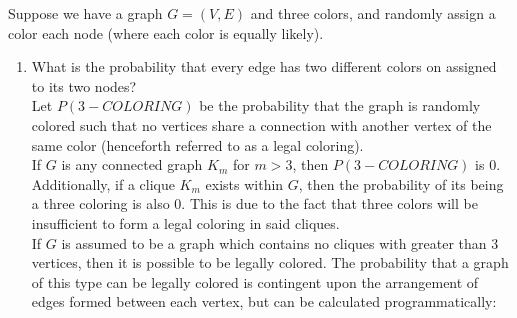 \documentclass{article}
\begin{document}
\nextprob
Suppose we have a graph $G=(V,E)$ and three colors, and randomly assign a color
each node (where each color is equally likely).
\begin{enumerate}
    \item What is the probability that every edge has two different colors on
        assigned to its two nodes? \\
        
        Let $P(3-COLORING)$ be the probability that the graph is randomly colored such that no vertices share a connection with another vertex of the same color (henceforth referred to as a legal coloring). \\
        
        If $G$ is any connected graph $K_m$ for $m > 3$, then $P(3-COLORING)$ is 0. Additionally, if a clique $K_m$ exists within $G$, then the probability of its being a three coloring is also 0. This is due to the fact that three colors will be insufficient to form a legal coloring in said cliques. \\
        
        If $G$ is assumed to be a graph which contains no cliques with greater than 3 vertices, then it is possible to be legally colored. The probability that a graph of this type can be legally colored is contingent upon the arrangement of edges formed between each vertex, but can be calculated programmatically:
        

\end{enumerate}
\end{document}
